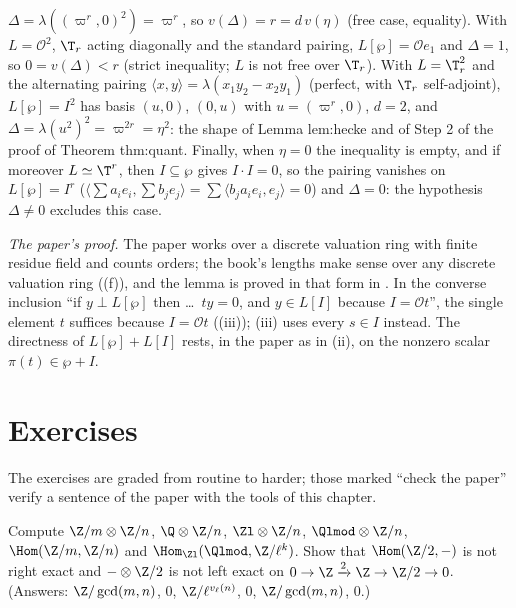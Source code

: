 \begin{remark}
$\Delta=\lambda((\varpi^r,0)^2)=\varpi^r$, so $v(\Delta)=r=d\,v(\eta)$ (free case, equality). With $L=\mathcal O^2$, $\T_r$ acting diagonally and the standard pairing, $L[\wp]=\mathcal Oe_1$
and $\Delta=1$, so $0=v(\Delta)<r$ (strict inequality; $L$ is not free over $\T_r$). With $L=\T_r^2$ and the alternating pairing $\langle x,y\rangle=\lambda(x_1y_2-x_2y_1)$ (perfect, with
$\T_r$ self-adjoint), $L[\wp]=I^2$ has basis $(u,0)$, $(0,u)$ with $u=(\varpi^r,0)$, $d=2$, and $\Delta=\lambda(u^2)^2=\varpi^{2r}=\eta^2$: the shape of Lemma lem:hecke and of Step 2 of the
proof of Theorem thm:quant. Finally, when $\eta=0$ the inequality is empty, and if moreover $L\simeq\T^r$, then $I\subseteq\wp$ gives $I\cdot I=0$, so the pairing vanishes on
$L[\wp]=I^r$ ($\langle\sum a_ie_i,\sum b_je_j\rangle=\sum\langle b_ja_ie_i,e_j\rangle=0$) and $\Delta=0$: the hypothesis $\Delta\ne0$ excludes this case.

\emph{The paper's proof.} The paper works over a discrete valuation ring with finite residue field and counts orders; the book's lengths make sense over any
discrete valuation ring ((f)), and the lemma is proved in that form in . In the converse inclusion ``if $y\perp L[\wp]$
then \dots\ $ty=0$, and $y\in L[I]$ because $I=\mathcal{O}t$'', the single element $t$ suffices because $I=\mathcal Ot$ ((iii));
(iii) uses every $s\in I$ instead. The directness of $L[\wp]+L[I]$ rests, in the paper as in
(ii), on the nonzero scalar $\pi(t)\in\wp+I$.
\end{remark}

\section{Exercises}\label{sec:modules:exercises}

The exercises are graded from routine to harder; those marked ``check the paper'' verify a sentence of the paper with the tools of this chapter.

\begin{exercise}\label{ex:modules:ex-tensor}
Compute $\Z/m\otimes\Z/n$, $\Q\otimes\Z/n$, $\Zl\otimes\Z/n$, $\Qlmod\otimes\Z/n$, $\Hom(\Z/m,\Z/n)$ and $\Hom_{\Zl}(\Qlmod,\Z/\ell^k)$. Show that $\Hom(\Z/2,-)$ is not right exact
and $-\otimes\Z/2$ is not left exact on $0\to\Z\xrightarrow2\Z\to\Z/2\to0$. (Answers: $\Z/\gcd(m,n)$, $0$, $\Z/\ell^{v_\ell(n)}$, $0$, $\Z/\gcd(m,n)$, $0$.)
\end{exercise}

